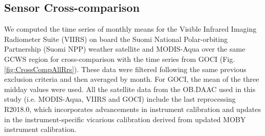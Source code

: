 \documentclass[10pt]{article}
\begin{document}
\subsection{Sensor Cross-comparison}

We computed the time series of monthly means for the Visible Infrared Imaging Radiometer Suite (VIIRS)\cite{Wang2014} on board the Suomi National Polar-orbiting Partnership (Suomi NPP) weather satellite and MODIS-Aqua over the same GCWS region for cross-comparison with the time series from GOCI (Fig. \ref{fig:CrossCompAllRrs}). 
These data were filtered following the same previous exclusion criteria and then averaged by month. 
For GOCI, the mean of the three midday values were used.
All the satellite data from the OB.DAAC used in this study (i.e. MODIS-Aqua, VIIRS and GOCI) include the last reprocessing R2018.0, which incorporates advancements in instrument calibration and updates in the instrument-specific vicarious calibration derived from updated MOBY instrument calibration.
\end{document}
